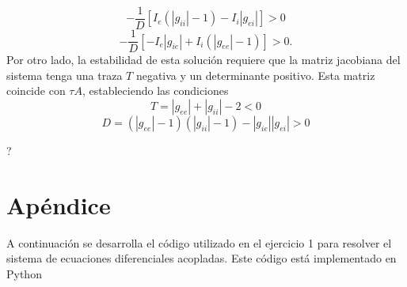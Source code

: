 \documentclass[aps,prb,twocolumn,superscriptaddress,floatfix,longbibliography]{revtex4-2}
\newcounter{para}
\begin{document}
\[ -\frac{1}{D} [ I_e (|g_{ii}| - 1) - I_i |g_{ei}| ] > 0 \]
\[ -\frac{1}{D} [ -I_e |g_{ie}| + I_i (|g_{ee}| - 1) ] > 0. \]
Por otro lado, la estabilidad de esta solución requiere que la matriz jacobiana del sistema tenga una traza \(T\) negativa y un determinante positivo. Esta matriz coincide con \(\tau A\), estableciendo las condiciones
\[ T = |g_{ee}| + |g_{ii}| - 2 < 0 \]
\[ D = (|g_{ee}| - 1)(|g_{ii}| - 1) - |g_{ie}||g_{ei}| > 0 \]

\onecolumngrid
?
\section{Apéndice}

A continuación se desarrolla el código utilizado en el ejercicio 1 para resolver el sistema de ecuaciones diferenciales acopladas. Este código está implementado en Python
\end{document}
